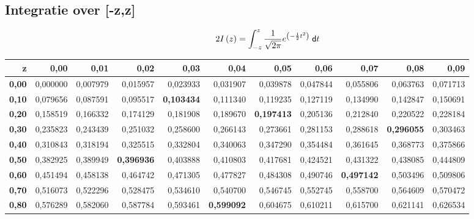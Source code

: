 \newpage
\subsection{Integratie over [-z,z]}
\label{sec:TweedeTabel}
  \normalsize
  \[
    2I\left(z\right) = \int_{-z}^z \frac{1}{\sqrt{2\pi}} e^{\left( -\frac{1}{2} t^2 \right)}\;\textsf{d}t
  \]
  \footnotesize
\begin{tabular}{|r|rrrrr|rrrrr|}
\hline
   {\bf z} & {\bf 0,00} & {\bf 0,01} & {\bf 0,02} & {\bf 0,03} & {\bf 0,04} & {\bf 0,05} & {\bf 0,06} & {\bf 0,07} & {\bf 0,08} & {\bf 0,09} \\
\hline \hline
{\bf 0,00} &   0,000000 &   0,007979 &   0,015957 &   0,023933 &   0,031907 &   0,039878 &   0,047844 &   0,055806 &   0,063763 &   0,071713 \\

{\bf 0,10} &   0,079656 &   0,087591 &   0,095517 & {\bf 0,103434} &   0,111340 &   0,119235 &   0,127119 &   0,134990 &   0,142847 &   0,150691 \\

{\bf 0,20} &   0,158519 &   0,166332 &   0,174129 &   0,181908 &   0,189670 & {\bf 0,197413} &   0,205136 &   0,212840 &   0,220522 &   0,228184 \\

{\bf 0,30} &   0,235823 &   0,243439 &   0,251032 &   0,258600 &   0,266143 &   0,273661 &   0,281153 &   0,288618 & {\bf 0,296055} &   0,303463 \\

{\bf 0,40} &   0,310843 &   0,318194 &   0,325515 &   0,332804 &   0,340063 &   0,347290 &   0,354484 &   0,361645 &   0,368773 &   0,375866 \\
\hline
{\bf 0,50} &   0,382925 &   0,389949 & {\bf 0,396936} &   0,403888 &   0,410803 &   0,417681 &   0,424521 &   0,431322 &   0,438085 &   0,444809 \\

{\bf 0,60} &   0,451494 &   0,458138 &   0,464742 &   0,471305 &   0,477827 &   0,484308 &   0,490746 & {\bf 0,497142} &   0,503496 &   0,509806 \\

{\bf 0,70} &   0,516073 &   0,522296 &   0,528475 &   0,534610 &   0,540700 &   0,546745 &   0,552745 &   0,558700 &   0,564609 &   0,570472 \\

{\bf 0,80} &   0,576289 &   0,582060 &   0,587784 &   0,593461 & {\bf 0,599092} &   0,604675 &   0,610211 &   0,615700 &   0,621141 &   0,626534 \\


\end{tabular}
